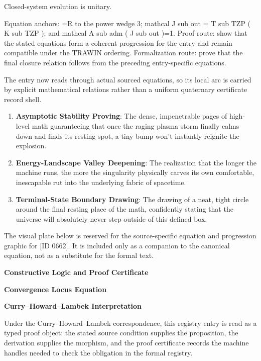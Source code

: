 Closed-system evolution is unitary.

Equation anchors: =R to the power wedge 3; mathcal J sub out = T sub TZP ( K sub TZP ); and mathcal A sub adm ( J sub out )=1. Proof route: show that the stated equations form a coherent progression for the entry and remain compatible under the TRAWIN ordering. Formalization route: prove that the final closure relation follows from the preceding entry-specific equations.

The entry now reads through actual sourced equations, so its local arc is carried by explicit mathematical relations rather than a uniform quaternary certificate record shell.
\endgroup

\begin{enumerate}[leftmargin=1.6em,itemsep=6pt,topsep=4pt]
\item \textbf{Asymptotic Stability Proving}: The dense, impenetrable pages of high-level math guaranteeing that once the raging plasma storm finally calms down and finds its resting spot, a tiny bump won't instantly reignite the explosion.
\item \textbf{Energy-Landscape Valley Deepening}: The realization that the longer the machine runs, the more the singularity physically carves its own comfortable, inescapable rut into the underlying fabric of spacetime.
\item \textbf{Terminal-State Boundary Drawing}: The drawing of a neat, tight circle around the final resting place of the math, confidently stating that the universe will absolutely never step outside of this defined box.
\end{enumerate}

\begingroup\footnotesize\sloppy
The visual plate below is reserved for the source-specific equation and progression graphic for [ID 0662]. It is included only as a companion to the canonical equation, not as a substitute for the formal text.
\par\endgroup
\ifTZPDarkEdition
{}
\fi

\clearpage
\begingroup\tzpsupportsetup
\noindent\textbf{\fontsize{10.8pt}{12.8pt}\selectfont [ID 0662] Constructive Logic and Proof Certificate}\par
\noindent\textbf{\fontsize{10pt}{12pt}\selectfont Convergence Locus Equation}\par
\vspace{0.45em}
\begingroup
\footnotesize
\setlength{\parskip}{0.22em}
\setlength{\parindent}{0pt}
\noindent\textbf{Curry--Howard--Lambek Interpretation}\par
Under the Curry--Howard--Lambek correspondence, this registry entry is read as a typed proof
object: the stated source condition supplies the proposition, the derivation supplies the
morphism, and the proof certificate records the machine handles needed to check the obligation
in the formal registry.

